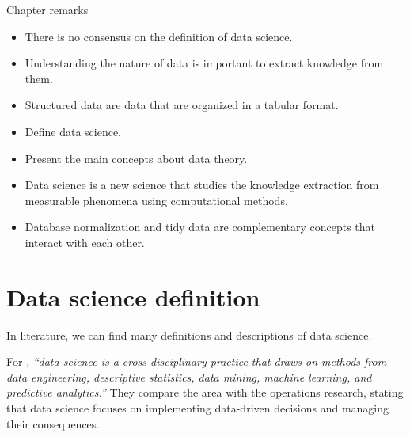 \begin{mainbox}{Chapter remarks}


  \startcontents[chapters]
  \vspace{1em}


  \begin{itemize}
    \itemsep0em
    \item There is no consensus on the definition of data science.
    \item Understanding the nature of data is important to extract knowledge from them.
    \item Structured data are data that are organized in a tabular format.
  \end{itemize}


  \begin{itemize}
    \itemsep0em
    \item Define data science.
    \item Present the main concepts about data theory.
  \end{itemize}


  \begin{itemize}
    \itemsep0em
    \item Data science is a new science that studies the knowledge extraction from
      measurable phenomena using computational methods.
    \item Database normalization and tidy data are complementary concepts that interact
      with each other.
  \end{itemize}
\end{mainbox}

{}
\clearpage

\section{Data science definition}

In literature, we can find many definitions and descriptions of data science.

For \textcite{Zumel2019}, \emph{``data science is a cross-disciplinary practice that draws
on methods from data engineering, descriptive statistics, data mining, machine learning,
and predictive analytics.''}  They compare the area with the operations research, stating
that data science focuses on implementing data-driven decisions and managing their
consequences.

